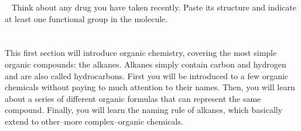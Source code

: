 \documentclass[main.tex]{subfiles}
\begin{document}
\begin{marginfigure}[0.5cm]
\begin{tcolorbox}[enhanced,colback=red!5!white,colframe=black!50!red,boxrule=1pt,
  arc=0pt,outer arc=0pt,drop heavy lifted shadow]
\faGears\ 
 Think about any drug you have taken recently. Paste its structure and indicate at least one functional group in the molecule. \end{tcolorbox}
 \end{marginfigure}




\section{\color{blue!30!black}{Alkanes}}
This first section will introduce organic chemistry, covering the most simple organic compounds: the alkanes. Alkanes simply contain carbon and hydrogen and are also called hydrocarbons. First you will be introduced to a few organic chemicals without paying to much attention to their names. Then, you will learn about a series of different organic formulas that can represent the same compound. Finally, you will learn the naming rule of alkanes, which basically extend to other--more complex--organic chemicals.
\sloppy
\end{document}
